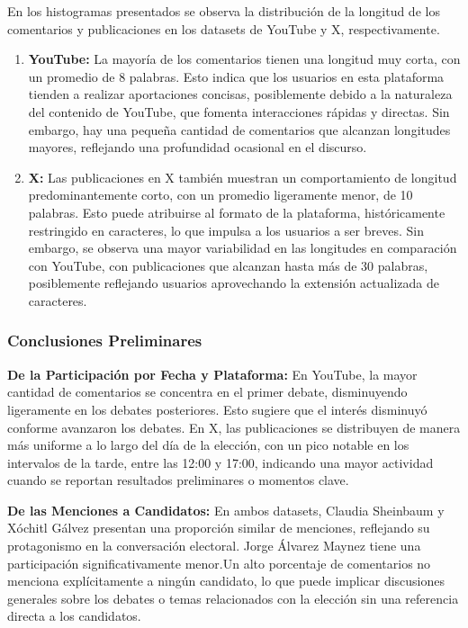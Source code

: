\documentclass[10pt, a4paper]{article}
\begin{document}
	En los histogramas presentados se observa la distribución de la longitud de los comentarios y publicaciones en los datasets de YouTube y X, respectivamente.
	
	\begin{enumerate}
		\item \textbf{YouTube:} La mayoría de los comentarios tienen una longitud muy corta, con un promedio de 8 palabras. Esto indica que los usuarios en esta plataforma tienden a realizar aportaciones concisas, posiblemente debido a la naturaleza del contenido de YouTube, que fomenta interacciones rápidas y directas. Sin embargo, hay una pequeña cantidad de comentarios que alcanzan longitudes mayores, reflejando una profundidad ocasional en el discurso.
		
		\item \textbf{X:} Las publicaciones en X también muestran un comportamiento de longitud predominantemente corto, con un promedio ligeramente menor, de 10 palabras. Esto puede atribuirse al formato de la plataforma, históricamente restringido en caracteres, lo que impulsa a los usuarios a ser breves. Sin embargo, se observa una mayor variabilidad en las longitudes en comparación con YouTube, con publicaciones que alcanzan hasta más de 30 palabras, posiblemente reflejando usuarios aprovechando la extensión actualizada de caracteres.
	\end{enumerate}
	
	\subsubsection{Conclusiones Preliminares}
	\textbf{De la Participación por Fecha y Plataforma:} En YouTube, la mayor cantidad de comentarios se concentra en el primer debate, disminuyendo ligeramente en los debates posteriores. Esto sugiere que el interés disminuyó conforme avanzaron los debates. En X, las publicaciones se distribuyen de manera más uniforme a lo largo del día de la elección, con un pico notable en los intervalos de la tarde, entre las 12:00 y 17:00, indicando una mayor actividad cuando se reportan resultados preliminares o momentos clave.
	
	\textbf{De las Menciones a Candidatos:} En ambos datasets, Claudia Sheinbaum y Xóchitl Gálvez presentan una proporción similar de menciones, reflejando su protagonismo en la conversación electoral. Jorge Álvarez Maynez tiene una participación significativamente menor.Un alto porcentaje de comentarios no menciona explícitamente a ningún candidato, lo que puede implicar discusiones generales sobre los debates o temas relacionados con la elección sin una referencia directa a los candidatos.
	
\end{document}
